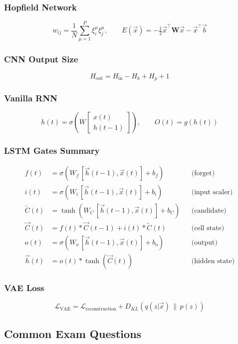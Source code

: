 \documentclass[11pt,a4paper]{article}
\newcommand{\vh}{\vec{h}}
\begin{document}
\subsubsection{Hopfield Network}
\[
w_{ij} = \frac{1}{N}\sum_{\mu=1}^{P} \xi_i^{\mu}\xi_j^{\mu}, \qquad
E(\vec{x}) = -\tfrac{1}{2}\vec{x}^\top \mathbf{W}\vec{x} - \vec{x}^\top\vec{b}
\]

\subsubsection{CNN Output Size}
\[
H_{\text{out}} = H_{\text{in}} - H_k + H_p + 1
\]

\subsubsection{Vanilla RNN}
\[
h(t) = \sigma\!\left(W\begin{bmatrix} x(t) \\ h(t-1) \end{bmatrix}\right), \qquad O(t) = g(h(t))
\]

\subsubsection{LSTM Gates Summary}
\begin{align*}
f(t) &= \sigma(W_f\,[\vh(t-1), \vec{x}(t)] + b_f) && \text{(forget)} \\
i(t) &= \sigma(W_i\,[\vh(t-1), \vec{x}(t)] + b_i) && \text{(input scaler)} \\
\tilde{C}(t) &= \tanh(W_C\,[\vh(t-1), \vec{x}(t)] + b_C) && \text{(candidate)} \\
\vec{C}(t) &= f(t) * \vec{C}(t-1) + i(t) * \tilde{C}(t) && \text{(cell state)} \\
o(t) &= \sigma(W_o\,[\vh(t-1), \vec{x}(t)] + b_o) && \text{(output)} \\
\vh(t) &= o(t) * \tanh(\vec{C}(t)) && \text{(hidden state)}
\end{align*}

\subsubsection{VAE Loss}
\[
\mathcal{L}_{\text{VAE}} = \mathcal{L}_{\text{reconstruction}} + D_{KL}(q(z|\vec{x})\,\|\,p(z))
\]

\subsection{Common Exam Questions}
\end{document}
